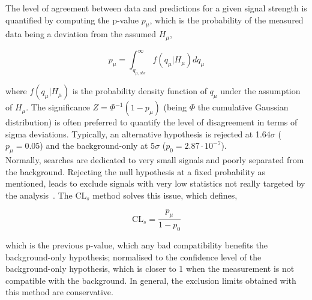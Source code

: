 The level of agreement between data and predictions for a given signal strength is quantified by computing the p-value $p_\mu$, which is the probability of the measured data being a deviation from the assumed $H_\mu$,

\begin{equation}
    p_\mu = \int_{q_{\mu,obs}}^\infty f(q_\mu|H_\mu)dq_\mu
\end{equation}

where $f(q_\mu|H_\mu)$ is the probability density function of $q_\mu$ under the assumption of $H_\mu$. The significance $Z=\Phi^{-1}(1-p_\mu)$ (being $\Phi$ the cumulative Gaussian distribution) is often preferred to quantify the level of disagreement in terms of sigma deviations. Typically, an alternative hypothesis is rejected at 1.64$\sigma$ ($p_\mu=0.05$) and the background-only at 5$\sigma$ ($p_0=2.87\cdot10^{-7}$).\\

Normally, searches are dedicated to very small signals and poorly separated from the background. Rejecting the null hypothesis at a fixed probability as mentioned, leads to exclude signals with very low statistics not really targeted by the analysis~\cite{JUNK1999435}. The CL$_{s}$ method solves this issue, which defines,

\begin{equation}
    \text{CL}_{s}=\frac{p_\mu}{1-p_0}
\end{equation}

which is the previous p-value, which any bad compatibility benefits the background-only hypothesis; normalised to the confidence level of the background-only hypothesis, which is closer to 1 when the measurement is not compatible with the background. In general, the exclusion limits obtained with this method are conservative.

